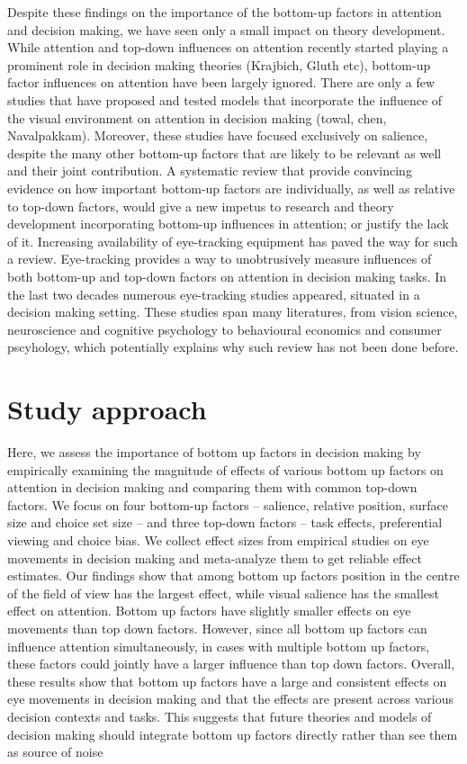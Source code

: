 \documentclass{article}
\begin{document}
Despite these findings on the importance of the bottom-up factors in attention and decision making, we have seen only a small impact on theory development. While attention and top-down influences on attention recently started playing a prominent role in decision making theories (Krajbich, Gluth etc), bottom-up factor influences on attention have been largely ignored. There are only a few studies that have proposed and tested models that incorporate the influence of the visual environment on attention in decision making (towal, chen, Navalpakkam). Moreover, these studies have focused exclusively on salience, despite the many other bottom-up factors that are likely to be relevant as well and their joint contribution. A systematic review that provide convincing evidence on how important bottom-up factors are individually, as well as relative to top-down factors, would give a new impetus to research and theory development incorporating bottom-up influences in attention; or justify the lack of it. Increasing availability of eye-tracking equipment has paved the way for such a review. Eye-tracking provides a way to unobtrusively measure influences of both bottom-up and top-down factors on attention in decision making tasks. In the last two decades numerous eye-tracking studies appeared, situated in a decision making setting. These studies span many literatures, from vision science, neuroscience and cognitive psychology to behavioural economics and consumer pscyhology, which potentially explains why such review has not been done before.

\section{Study approach} 
Here, we assess the importance of bottom up factors in decision making by empirically examining the magnitude of effects of various bottom up factors on attention in decision making and comparing them with common top-down factors. We focus on four bottom-up factors – salience, relative position, surface size and choice set size – and three top-down factors – task effects, preferential viewing and choice bias. We collect effect sizes from empirical studies on eye movements in decision making and meta-analyze them to get reliable effect estimates. Our findings show that among bottom up factors position in the centre of the field of view has the largest effect, while visual salience has the smallest effect on attention. Bottom up factors have slightly smaller effects on eye movements than top down factors.  However, since all bottom up factors can influence attention simultaneously, in cases with multiple bottom up factors, these factors could jointly have a larger influence than top down factors. Overall, these results show that bottom up factors have a large and consistent effects on eye movements in decision making and that the effects are present across various decision contexts and tasks. This suggests that future theories and models of decision making should integrate bottom up factors directly rather than see them as source of noise
\end{document}
